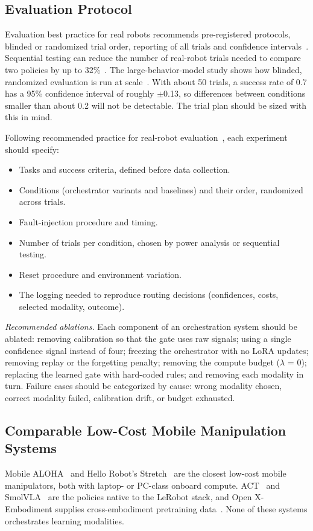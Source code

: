 \documentclass[journal]{IEEEtran}
\begin{document}
\subsection{Evaluation Protocol}\label{sec:protocol}
Evaluation best practice for real robots recommends pre-registered protocols, blinded or randomized trial order, reporting of all trials and confidence intervals~\cite{KressGazit2024}. Sequential testing can reduce the number of real-robot trials needed to compare two policies by up to 32\%~\cite{Snyder2025}. The large-behavior-model study shows how blinded, randomized evaluation is run at scale~\cite{TRI2025}. With about 50 trials, a success rate of 0.7 has a 95\% confidence interval of roughly \ensuremath{\pm }0.13, so differences between conditions smaller than about 0.2 will not be detectable. The trial plan should be sized with this in mind.

Following recommended practice for real-robot evaluation~\cite{KressGazit2024,Snyder2025}, each experiment should specify:

\begin{itemize}
\item Tasks and success criteria, defined before data collection.
\item Conditions (orchestrator variants and baselines) and their order, randomized across trials.
\item Fault-injection procedure and timing.
\item Number of trials per condition, chosen by power analysis or sequential testing.
\item Reset procedure and environment variation.
\item The logging needed to reproduce routing decisions (confidences, costs, selected modality, outcome).
\end{itemize}

\textit{Recommended ablations.} Each component of an orchestration system should be ablated: removing calibration so that the gate uses raw signals; using a single confidence signal instead of four; freezing the orchestrator with no LoRA updates; removing replay or the forgetting penalty; removing the compute budget (\ensuremath{\lambda} = 0); replacing the learned gate with hard-coded rules; and removing each modality in turn. Failure cases should be categorized by cause: wrong modality chosen, correct modality failed, calibration drift, or budget exhausted.


\subsection{Comparable Low-Cost Mobile Manipulation Systems}\label{sec:comparable-sys}
Mobile ALOHA~\cite{Fu2024} and Hello Robot's Stretch~\cite{Kemp2022} are the closest low-cost mobile manipulators, both with laptop- or PC-class onboard compute. ACT~\cite{Zhao2023} and SmolVLA~\cite{Shukor2025} are the policies native to the LeRobot stack, and Open X-Embodiment supplies cross-embodiment pretraining data~\cite{OXE2024}. None of these systems orchestrates learning modalities.
\end{document}

